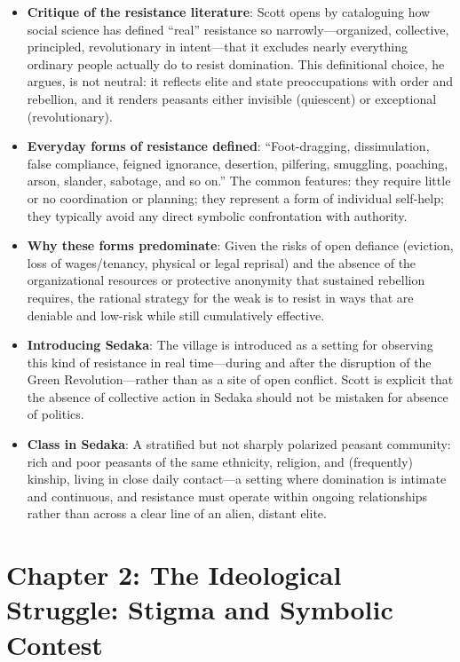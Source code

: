 \documentclass[12pt]{article}
\begin{document}
\begin{itemize}[leftmargin=*, itemsep=4pt]
    \item \textbf{Critique of the resistance literature}: Scott opens by cataloguing how social science has defined ``real'' resistance so narrowly---organized, collective, principled, revolutionary in intent---that it excludes nearly everything ordinary people actually do to resist domination. This definitional choice, he argues, is not neutral: it reflects elite and state preoccupations with order and rebellion, and it renders peasants either invisible (quiescent) or exceptional (revolutionary).
    \item \textbf{Everyday forms of resistance defined}: ``Foot-dragging, dissimulation, false compliance, feigned ignorance, desertion, pilfering, smuggling, poaching, arson, slander, sabotage, and so on.'' The common features: they require little or no coordination or planning; they represent a form of individual self-help; they typically avoid any direct symbolic confrontation with authority.
    \item \textbf{Why these forms predominate}: Given the risks of open defiance (eviction, loss of wages/tenancy, physical or legal reprisal) and the absence of the organizational resources or protective anonymity that sustained rebellion requires, the rational strategy for the weak is to resist in ways that are deniable and low-risk while still cumulatively effective.
    \item \textbf{Introducing Sedaka}: The village is introduced as a setting for observing this kind of resistance in real time---during and after the disruption of the Green Revolution---rather than as a site of open conflict. Scott is explicit that the absence of collective action in Sedaka should not be mistaken for absence of politics.
    \item \textbf{Class in Sedaka}: A stratified but not sharply polarized peasant community: rich and poor peasants of the same ethnicity, religion, and (frequently) kinship, living in close daily contact---a setting where domination is intimate and continuous, and resistance must operate within ongoing relationships rather than across a clear line of an alien, distant elite.
\end{itemize}

\section{Chapter 2: The Ideological Struggle: Stigma and Symbolic Contest}
\end{document}
